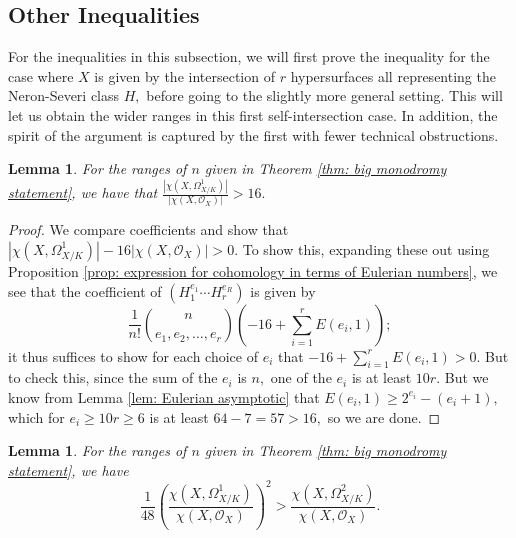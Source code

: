 \documentclass{article}
\newtheorem{lemma}[thm]{Lemma}
\theoremstyle{definition}
\theoremstyle{remark}
\begin{document}
\subsection{Other Inequalities}
For the inequalities in this subsection, we will first prove the inequality for the case where $X$ is given by the intersection of $r$ hypersurfaces all representing the Neron-Severi class $H,$ before going to the slightly more general setting. This will let us obtain the wider ranges in this first self-intersection case. In addition, the spirit of the argument is captured by the first with fewer technical obstructions.
\begin{lemma}\label{lem: the respective ratios are big enough}
For the ranges of $n$ given in Theorem \ref{thm: big monodromy statement}, we have that $\frac{|\chi(X, \Omega^1_{X/K})|}{|\chi(X, \mathcal{O}_X)|} > 16.$
\end{lemma}
\begin{proof}
We compare coefficients and show that $|\chi(X, \Omega^1_{X/K})| - 16 |\chi(X, \mathcal{O}_X)| > 0.$ To show this, expanding these out using Proposition \ref{prop: expression for cohomology in terms of Eulerian numbers}, we see that the coefficient of $(H_1^{e_1}\cdots H_r^{e_R})$ is given by \[\frac{1}{n!} \binom{n}{e_1, e_2,\ldots, e_r} \left(-16 + \sum\limits_{i=1}^r E(e_i, 1) \right);\] it thus suffices to show for each choice of $e_i$ that $-16 + \sum\limits_{i=1}^r E(e_i, 1)  > 0.$ But to check this, since the sum of the $e_i$ is $n,$ one of the $e_i$ is at least $10r.$ But we know from Lemma \ref{lem: Eulerian asymptotic} that $E(e_i, 1) \geq 2^{e_i} - (e_i+1),$ which for $e_i \geq 10r \geq 6$ is at least $64 - 7 = 57 > 16,$ so we are done.
\end{proof}
\begin{lemma}\label{lem: the core q=2 inequality}
For the ranges of $n$ given in Theorem \ref{thm: big monodromy statement}, we have \[\frac{1}{48} \left(\frac{\chi(X, \Omega^1_{X/K})}{\chi(X, \mathcal{O}_X)}\right)^2 > \frac{\chi(X, \Omega^2_{X/K})}{\chi(X, \mathcal{O}_X)}.\]
\end{lemma}
\end{document}
